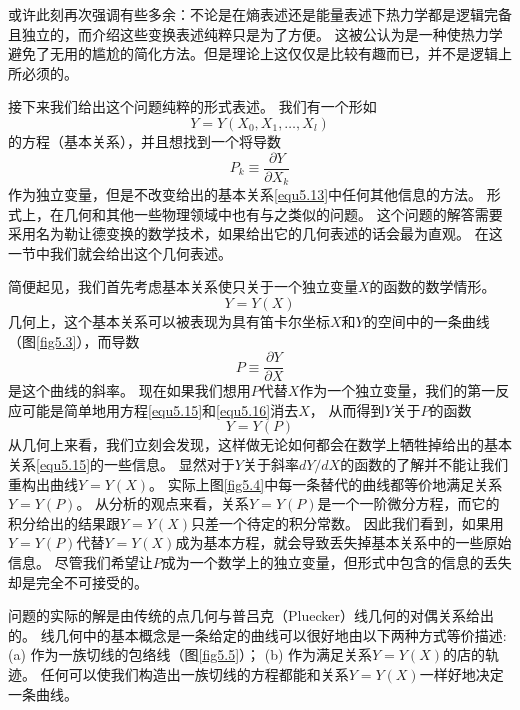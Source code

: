 或许此刻再次强调有些多余：不论是在熵表述还是能量表述下热力学都是逻辑完备且独立的，而介绍这些变换表述纯粹只是为了方便。
这被公认为是一种使热力学避免了无用的尴尬的简化方法。但是理论上这仅仅是比较有趣而已，并不是逻辑上所必须的。

接下来我们给出这个问题纯粹的形式表述。
我们有一个形如
\begin{equation}
\label{equ5.13}
  Y=Y(X_0,X_1,\ldots,X_l)
\end{equation}
的方程（基本关系），并且想找到一个将导数
\begin{equation}
\label{equ5.14}
  P_k\equiv\frac{\partial Y}{\partial X_k}
\end{equation}
作为独立变量，但是不改变给出的基本关系\eqref{equ5.13}中任何其他信息的方法。
形式上，在几何和其他一些物理领域中也有与之类似的问题。
这个问题的解答需要采用名为勒让德变换的数学技术，如果给出它的几何表述的话会最为直观。
在这一节中我们就会给出这个几何表述。

简便起见，我们首先考虑基本关系使只关于一个独立变量$X$的函数的数学情形。
\begin{equation}
\label{equ5.15}
  Y=Y(X)
\end{equation}
几何上，这个基本关系可以被表现为具有笛卡尔坐标$X$和$Y$的空间中的一条曲线（图\ref{fig5.3}），而导数
\begin{equation}
\label{equ5.16}
  P\equiv\frac{\partial Y}{\partial X}
\end{equation}
是这个曲线的斜率。
现在如果我们想用$P$代替$X$作为一个独立变量，我们的第一反应可能是简单地用方程\eqref{equ5.15}和\eqref{equ5.16}消去$X$，
从而得到$Y$关于$P$的函数
\begin{equation}
\label{equ5.17}
  Y=Y(P)
\end{equation}
从几何上来看，我们立刻会发现，这样做无论如何都会在数学上牺牲掉给出的基本关系\eqref{equ5.15}的一些信息。
显然对于$Y$关于斜率$dY/dX$的函数的了解并不能让我们重构出曲线$Y=Y(X)$。
实际上图\ref{fig5.4}中每一条替代的曲线都等价地满足关系$Y=Y(P)$。
从分析的观点来看，关系$Y=Y(P)$是一个一阶微分方程，而它的积分给出的结果跟$Y=Y(X)$只差一个待定的积分常数。
因此我们看到，如果用$Y=Y(P)$代替$Y=Y(X)$成为基本方程，就会导致丢失掉基本关系中的一些原始信息。
尽管我们希望让$P$成为一个数学上的独立变量，但形式中包含的信息的丢失却是完全不可接受的。

问题的实际的解是由传统的点几何与普吕克（Pluecker）线几何的对偶关系给出的。
线几何中的基本概念是一条给定的曲线可以很好地由以下两种方式等价描述:
(a) 作为一族切线的包络线（图\ref{fig5.5}）；
(b) 作为满足关系$Y=Y(X)$的店的轨迹。
任何可以使我们构造出一族切线的方程都能和关系$Y=Y(X)$一样好地决定一条曲线。

